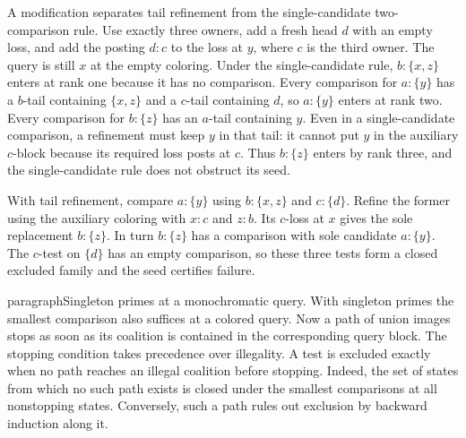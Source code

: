 A modification separates tail refinement from the
single-candidate two-comparison rule. Use exactly
three owners, add a fresh head $d$ with an empty
loss, and add the posting $d{:}c$ to the loss at $y$,
where $c$ is the third owner. The query is still
$x$ at the empty coloring. Under the single-candidate
rule, $b:\{x,z\}$ enters at rank one because it has
no comparison. Every comparison for $a:\{y\}$
has a $b$-tail containing $\{x,z\}$ and a $c$-tail
containing $d$, so $a:\{y\}$ enters at rank two.
Every comparison for $b:\{z\}$ has an $a$-tail
containing $y$. Even in a single-candidate comparison,
a refinement must keep $y$ in that tail: it cannot
put $y$ in the auxiliary $c$-block because its
required loss posts at $c$. Thus $b:\{z\}$ enters
by rank three, and the single-candidate rule does
not obstruct its seed.

With tail refinement, compare $a:\{y\}$ using
$b:\{x,z\}$ and $c:\{d\}$. Refine the former using
the auxiliary coloring with $x{:}c$ and $z{:}b$.
Its $c$-loss at $x$ gives the sole replacement
$b:\{z\}$. In turn $b:\{z\}$ has a comparison
with sole candidate $a:\{y\}$. The $c$-test on
$\{d\}$ has an empty comparison, so these three
tests form a closed excluded family and the seed
certifies failure.

paragraph{Singleton primes at a monochromatic query.}
With singleton primes the smallest comparison also suffices
at a colored query. Now a path of union images stops as soon
as its coalition is contained in the corresponding query block.
The stopping condition takes precedence over illegality.
A test is excluded exactly when no path reaches an illegal
coalition before stopping. Indeed, the set of states from
which no such path exists is closed under the smallest
comparisons at all nonstopping states. Conversely, such a
path rules out exclusion by backward induction along it.

